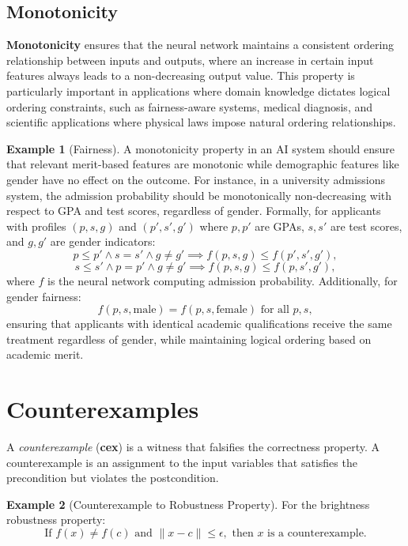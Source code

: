 \documentclass[oneside,11pt,dvipsnames]{book}
\numberwithin{equation}{section}
\theoremstyle{definition}
\newtheorem{example}{Example}[section]
\theoremstyle{remark}
\begin{document}
\subsection{Monotonicity}

\textbf{Monotonicity} ensures that the neural network maintains a consistent ordering relationship between inputs and outputs, where an increase in certain input features always leads to a non-decreasing output value. This property is particularly important in applications where domain knowledge dictates logical ordering constraints, such as fairness-aware systems, medical diagnosis, and scientific applications where physical laws impose natural ordering relationships.

\begin{example}[Fairness]
    A monotonicity property in an AI system should ensure that relevant merit-based features are monotonic while demographic features like gender have no effect on the outcome. For instance, in a university admissions system, the admission probability should be monotonically non-decreasing with respect to GPA and test scores, regardless of gender. Formally, for applicants with profiles $(p, s, g)$ and $(p', s', g')$ where $p, p'$ are GPAs, $s, s'$ are test scores, and $g, g'$ are gender indicators:
\[
p \leq p' \land s = s' \land g \neq g' \implies f(p, s, g) \leq f(p', s', g'),
\]
\[
s \leq s' \land p = p' \land g \neq g' \implies f(p, s, g) \leq f(p, s', g'),
\]
where $f$ is the neural network computing admission probability. Additionally, for gender fairness:
\[
f(p, s, \text{male}) = f(p, s, \text{female}) \text{ for all } p, s,
\]
ensuring that applicants with identical academic qualifications receive the same treatment regardless of gender, while maintaining logical ordering based on academic merit.
\end{example}



\section{Counterexamples}\label{sec:counterexamples}

A \emph{counterexample} (\textbf{cex}) is a witness that falsifies the correctness property. A counterexample is an assignment to the input variables that satisfies the precondition but violates the postcondition.

\begin{example}[Counterexample to Robustness Property]
For the brightness robustness property:
\[
\text{If } f(x) \neq f(c) \text{ and } \|x - c\| \leq \epsilon, \text{ then } x \text{ is a counterexample.}
\]
\end{example}
\end{document}
